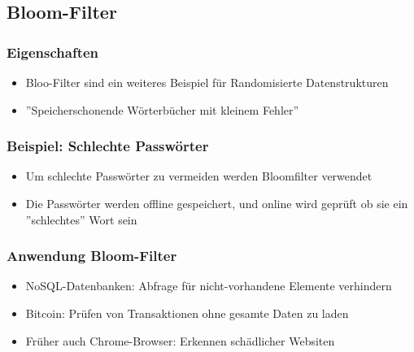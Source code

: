 	\newpage
	\subsection{Bloom-Filter}
		\begin{minipage}[t]{0.45\textwidth}
			\subsubsection{Eigenschaften}
				\begin{itemize}
					\item Bloo-Filter sind ein weiteres Beispiel für Randomisierte Datenstrukturen
					\item ''Speicherschonende Wörterbücher mit kleinem Fehler''
				\end{itemize}
		\end{minipage}
		\hspace{0.5cm}
		\begin{minipage}[t]{0.5\textwidth}
			\subsubsection{Beispiel: Schlechte Passwörter}
				\begin{itemize}
					\item Um schlechte Passwörter zu vermeiden werden Bloomfilter verwendet
					\item Die Passwörter werden offline gespeichert, und online wird geprüft ob sie
						ein ''schlechtes'' Wort sein
				\end{itemize}
		\end{minipage}


		\subsubsection{Anwendung Bloom-Filter}
			\begin{itemize}
				\item NoSQL-Datenbanken: Abfrage für nicht-vorhandene Elemente verhindern
				\item Bitcoin: Prüfen von Transaktionen ohne gesamte Daten zu laden
				\item Früher auch Chrome-Browser: Erkennen schädlicher Websiten
			\end{itemize}


